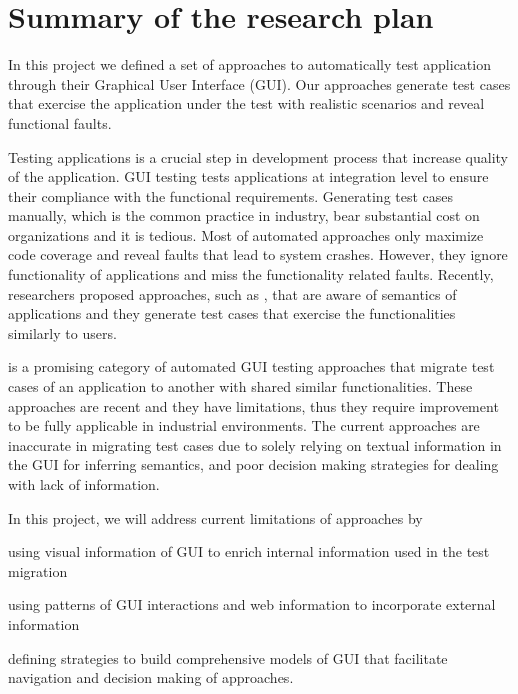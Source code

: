 	\section{Summary of the research plan}


In this project we defined a set of approaches to automatically test application through their Graphical User Interface (GUI).
Our approaches generate test cases that exercise the application under the test with realistic scenarios and reveal functional faults.


Testing applications is a crucial step in development process that increase quality of the application.
GUI testing tests applications at integration level to ensure their compliance with the functional requirements. 
Generating test cases manually, which is the common practice in industry, bear substantial cost on organizations and it is tedious.
Most of automated approaches only maximize code coverage and reveal faults that lead to system crashes.
However, they ignore functionality of applications and miss the functionality related faults.
Recently, researchers proposed approaches, such as \testreuse, that are aware of semantics of applications and they generate test cases that exercise the functionalities  similarly to users.


\testreuse is a promising category of automated GUI testing approaches that migrate test cases of an application to another with shared similar functionalities.
These approaches are recent and they have limitations, thus they require improvement to be fully applicable in industrial environments. 
The current \testreuse approaches are inaccurate in migrating test cases due to solely relying on textual information in the GUI for inferring semantics, and poor decision making strategies for dealing with lack of information.  


In this project, we will address current limitations of \testreuse approaches by
\begin{inparaenum}[(i)]
\item using visual information of GUI to enrich internal information used in the test migration
\item using patterns of GUI interactions and web information to incorporate external information
\item defining strategies to build comprehensive models of GUI that facilitate navigation and decision making of \testreuse approaches.
\end{inparaenum}


